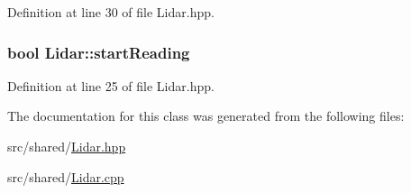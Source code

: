 Definition at line 30 of file Lidar.\-hpp.

\hypertarget{classLidar_a69b0909cc44f4e4e155d0ae2aa4ef3b4}{
\subsubsection[{start\-Reading}]{\setlength{\rightskip}{0pt plus 5cm}bool Lidar\-::start\-Reading\hspace{0.3cm}{\ttfamily [private]}}}\label{classLidar_a69b0909cc44f4e4e155d0ae2aa4ef3b4}


Definition at line 25 of file Lidar.\-hpp.



The documentation for this class was generated from the following files\-:\begin{DoxyCompactItemize}
\item 
src/shared/\hyperlink{Lidar_8hpp}{Lidar.\-hpp}\item 
src/shared/\hyperlink{Lidar_8cpp}{Lidar.\-cpp}\end{DoxyCompactItemize}
